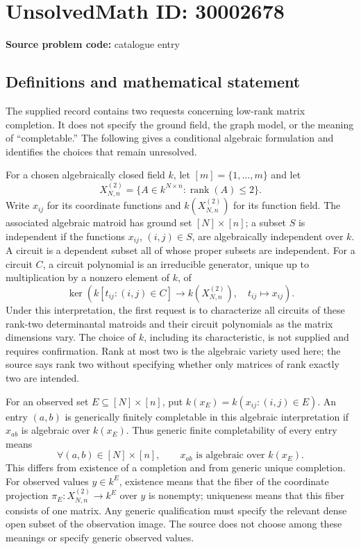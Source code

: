 \documentclass[11pt]{article}
\begin{document}
\section*{UnsolvedMath ID: 30002678}
\textbf{Source problem code:} catalogue entry
\subsection{Definitions and mathematical statement}
The supplied record contains two requests concerning low-rank matrix completion. It does not specify the ground field, the graph model, or the meaning of ``completable.'' The following gives a conditional algebraic formulation and identifies the choices that remain unresolved.

For a chosen algebraically closed field \(k\), let \([m]=\{1,\ldots,m\}\) and let
\[
X_{N,n}^{(2)}=\{A\in k^{N\times n}:\operatorname{rank}(A)\leq 2\}.
\]
Write \(x_{ij}\) for its coordinate functions and \(k(X_{N,n}^{(2)})\) for its function field. The associated algebraic matroid has ground set \([N]\times[n]\); a subset \(S\) is independent if the functions \(x_{ij}\), \((i,j)\in S\), are algebraically independent over \(k\). A circuit is a dependent subset all of whose proper subsets are independent. For a circuit \(C\), a circuit polynomial is an irreducible generator, unique up to multiplication by a nonzero element of \(k\), of
\[
\ker\!\left(k[t_{ij}:(i,j)\in C]\longrightarrow k(X_{N,n}^{(2)}),\quad t_{ij}\longmapsto x_{ij}\right).
\]
Under this interpretation, the first request is to characterize all circuits of these rank-two determinantal matroids and their circuit polynomials as the matrix dimensions vary. The choice of \(k\), including its characteristic, is not supplied and requires confirmation. Rank at most two is the algebraic variety used here; the source says rank two without specifying whether only matrices of rank exactly two are intended.

For an observed set \(E\subseteq[N]\times[n]\), put \(k(x_E)=k(x_{ij}:(i,j)\in E)\). An entry \((a,b)\) is generically finitely completable in this algebraic interpretation if \(x_{ab}\) is algebraic over \(k(x_E)\). Thus generic finite completability of every entry means
\[
\forall(a,b)\in[N]\times[n],\qquad x_{ab}\text{ is algebraic over }k(x_E).
\]
This differs from existence of a completion and from generic unique completion. For observed values \(y\in k^E\), existence means that the fiber of the coordinate projection \(\pi_E:X_{N,n}^{(2)}\to k^E\) over \(y\) is nonempty; uniqueness means that this fiber consists of one matrix. Any generic qualification must specify the relevant dense open subset of the observation image. The source does not choose among these meanings or specify generic observed values.
\end{document}
